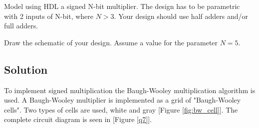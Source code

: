 \documentclass[../main.tex]{subfiles}
\begin{document}
Model using HDL a signed N-bit multiplier. The design has to be parametric with 2 inputs of N-bit, where $N > 3$. Your design should use half adders and/or full adders.

Draw the schematic of your design. Assume a value for the parameter $N = 5$.

\subsection*{Solution}

To implement signed multiplication the Baugh-Wooley multiplication algorithm is used. A Baugh-Wooley multiplier is implemented as a grid of "Baugh-Wooley cells". Two types of cells are used, white and gray [Figure \ref{fig:bw_cell}]. The complete circuit diagram is seen in [Figure \ref{q7}].
\end{document}
